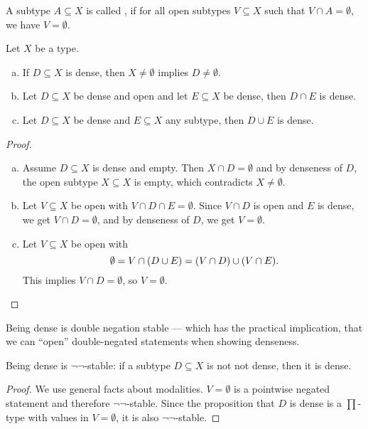 \begin{definition}
  A subtype $A\subseteq X$ is called ,
  if for all open subtypes $V\subseteq X$ such that $V\cap A=\emptyset$, we have $V=\emptyset$.
\end{definition}

\begin{lemma}%
  \label{basic-dense-operations}
  Let $X$ be a type.
  \begin{enumerate}[(a)]
  \item If $D\subseteq X$ is dense, then $X\neq \emptyset$ implies $D\neq \emptyset$.
  \item Let $D \subseteq X$ be dense and open and let $E \subseteq X$ be dense,
    then $D\cap E$ is dense.
  \item Let $D\subseteq X$ be dense and $E\subseteq X$ any subtype, then $D\cup E$ is dense.
  \end{enumerate}
\end{lemma}

\begin{proof}
  \begin{enumerate}[(a)]
  \item Assume $D\subseteq X$ is dense and empty.
    Then $X\cap D=\emptyset$ and by denseness of $D$,
    the open subtype $X \subseteq X$ is empty,
    which contradicts $X\neq \emptyset$.
  \item Let $V\subseteq X$ be open with $V\cap D\cap E=\emptyset$.
    Since $V \cap D$ is open and $E$ is dense,
    we get $V \cap D = \emptyset$,
    and by denseness of $D$, we get $V=\emptyset$.
  \item Let $V\subseteq X$ be open with
    \[
      \emptyset=V\cap (D\cup E)=(V\cap D) \cup (V\cap E)\rlap{.}
    \]
    This implies $V\cap D=\emptyset$,
    so $V=\emptyset$.
  \end{enumerate}
\end{proof}

Being dense is double negation stable ---
which has the practical implication,
that we can ``open'' double-negated statements when showing denseness.

\begin{proposition}%
  \label{dense-double-negation-stable}
  Being dense is $\neg\neg$-stable:
  if a subtype $D \subseteq X$ is not not dense, then it is dense.
\end{proposition}

\begin{proof}
  We use general facts about modalities.
  $V=\emptyset$ is a pointwise negated statement and therefore $\neg\neg$-stable.
  Since the proposition that $D$ is dense is a $\prod$-type with values in $V=\emptyset$,
  it is also $\neg\neg$-stable.
\end{proof}

